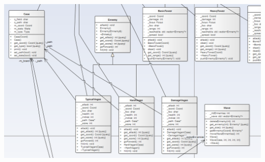 \documentclass[12pt,a4paper]{article}
\begin{document}
  \includegraphics[height=20cm,width=20cm]{classDiagram3.png}

  
\end{document}
